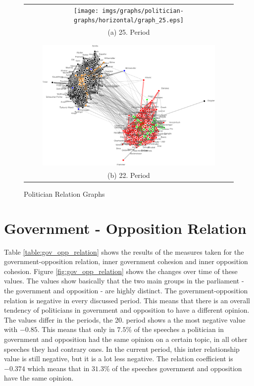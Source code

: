 \begin{figure}
\center
\begin{tabular}{ c }
	\texttt{[image: imgs/graphs/politician-graphs/horizontal/graph\_25.eps]}
	\\
	(a) 25. Period
	\\
	\\
	\hline
	\\
	
	\includegraphics[width=0.85\textwidth]{imgs/graphs/politician-graphs/horizontal/graph_22.eps}
	\\
	(b) 22. Period
\end{tabular}
	
	
	\caption{Politician Relation Graphs}
	\label{fig:pol_graphs1}
\end{figure}

\section{Government - Opposition Relation}
\label{sec:gov_opp_relation}
Table \ref{table:gov_opp_relation} shows the results of the measures taken for the government-opposition relation, inner government cohesion and inner opposition cohesion. Figure \ref{fig:gov_opp_relation} shows the changes over time of these values. The values show basically that the two main groups in the parliament - the government and opposition - are highly distinct. The government-opposition relation is negative in every discussed period. This means that there is an overall tendency of politicians in government and opposition to have a different opinion. The values differ in the periods, the 20. period shows a the most negative value with $-0.85$. This means that only in $7.5$\% of the speeches a politician in government and opposition had the same opinion on a certain topic, in all other speeches they had contrary ones. In the current period, this inter relationship value is still negative, but it is a lot less negative. The relation coefficient is $-0.374$ which means that in $31.3$\% of the speeches government and opposition have the same opinion.



